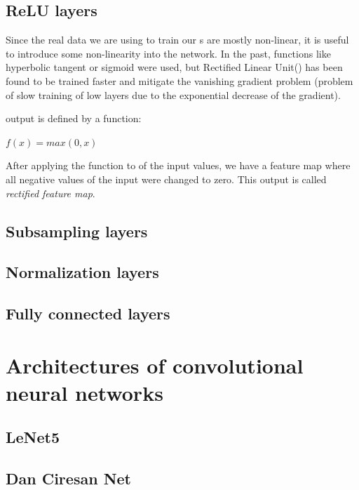 \subsection{ReLU layers}
\label{relu-layers}

Since the real data we are using to train our s are mostly non-linear, it is useful to introduce some non-linearity into the network. In the past, functions like hyperbolic tangent or sigmoid were used, but Rectified Linear Unit() has been found to be trained faster and mitigate the vanishing gradient problem (problem of slow training of low layers due to the exponential decrease of the gradient). 

 output is defined by a function:

$f(x) = max(0, x)$

After applying the  function to of the input values, we have a feature map where all negative values of the input were changed to zero. This output is called \textit{rectified feature map}. 

\subsection{Subsampling layers}
\label{subsampling}

\subsection{Normalization layers}
\label{norm-layers}

\subsection{Fully connected layers}
\label{fc-layers}

\section{Architectures of convolutional neural networks}
\label{cnn-architectures}

\subsection{LeNet5} %
\label{lenet}

\subsection{Dan Ciresan Net}
\label{ciresan}

